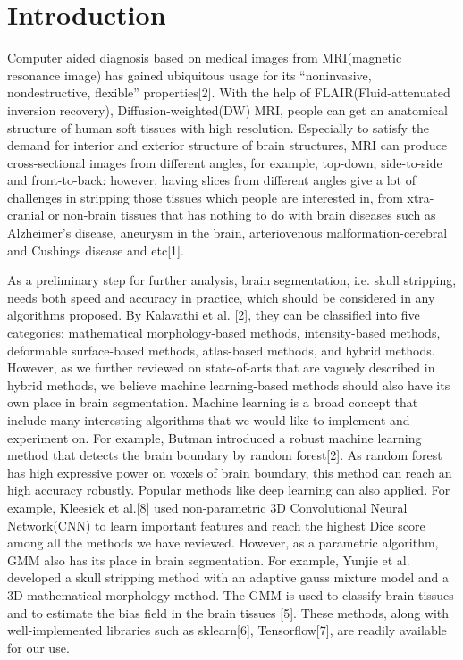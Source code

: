 \documentclass[conference]{IEEEtran}
\begin{document}
\section{Introduction}
Computer aided diagnosis based on medical images from MRI(magnetic resonance image) has gained ubiquitous usage for its “noninvasive, nondestructive, flexible” properties[2]. With the help of FLAIR(Fluid-attenuated inversion recovery), Diffusion-weighted(DW) MRI, people can get an anatomical structure of human soft tissues with high resolution. Especially to satisfy the demand for interior and exterior structure of brain structures, MRI can produce cross-sectional images from different angles, for example, top-down, side-to-side and front-to-back: however, having slices from different angles give a lot of challenges in stripping those tissues which people are interested in, from xtra-cranial or non-brain tissues that has nothing to do with brain diseases such as Alzheimer’s disease, aneurysm in the brain, arteriovenous malformation-cerebral and Cushings disease and etc[1]. 

As a preliminary step for further analysis, brain segmentation, i.e. skull stripping, needs both speed and accuracy in practice, which should be considered in any algorithms proposed. By Kalavathi et al. [2], they can be classified into five categories: mathematical morphology-based methods, intensity-based methods, deformable surface-based methods, atlas-based methods, and hybrid methods. However, as we further reviewed on state-of-arts that are vaguely described in hybrid methods, we believe machine learning-based methods should also have its own place in brain segmentation. Machine learning is a broad concept that include many interesting algorithms that we would like to implement and experiment on. For example, Butman introduced a robust machine learning method that detects the brain boundary by random forest[2]. As random forest has high expressive power on voxels of brain boundary, this method can reach an high accuracy robustly. Popular methods like deep learning can also applied. For example, Kleesiek et al.[8] used non-parametric 3D Convolutional Neural Network(CNN) to learn important features and reach the highest Dice score among all the methods we have reviewed. However, as a parametric algorithm, GMM also has its place in brain segmentation. For example, Yunjie et al. developed a skull stripping method with an adaptive gauss mixture model and a 3D mathematical morphology method. The GMM is used to classify brain tissues and to estimate the bias field in the brain tissues [5]. These methods, along with well-implemented libraries such as sklearn[6], Tensorflow[7], are readily available for our use.
\end{document}
